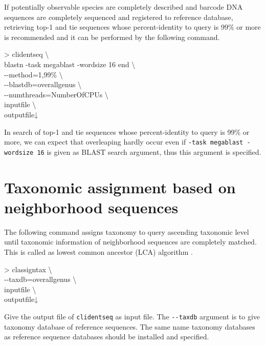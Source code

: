 \documentclass[titlepage,10pt,a4paper,english]{jsbook}
\newenvironment{cmd}{\begin{oframed}\raggedright\ttfamily\footnotesize\setlength{\baselineskip}{1.4em}}{\end{oframed}\vspace{-1em}}
\begin{document}
If potentially observable species are completely described and barcode DNA sequences are completely sequenced and registered to reference database, retrieving top-1 and tie sequences whose percent-identity to query is 99\% or more is recommended and it can be performed by the following command.
\begin{cmd}
{\textgreater} clidentseq {\textbackslash}\\
blastn -task megablast -word{\textunderscore}size 16 end {\textbackslash}\\
{-}{-}method=1,99\% {\textbackslash}\\
{-}{-}blastdb=overall{\textunderscore}genus {\textbackslash}\\
{-}{-}numthreads=NumberOfCPUs {\textbackslash}\\
inputfile {\textbackslash}\\
outputfile↓
\end{cmd}
In search of top-1 and tie sequences whose percent-identity to query is 99\% or more, we can expect that overleaping hardly occur even if \texttt{-task megablast -word{\textunderscore}size 16} is given as BLAST search argument, thus this argument is specified.

\section{Taxonomic assignment based on neighborhood sequences}

The following command assigns taxonomy to query ascending taxonomic level until taxonomic information of neighborhood sequences are completely matched.
This is called as lowest common ancestor (LCA) algorithm \citep{Huson2007}.
\begin{cmd}
{\textgreater} classigntax {\textbackslash}\\
{-}{-}taxdb=overall{\textunderscore}genus {\textbackslash}\\
inputfile {\textbackslash}\\
outputfile↓
\end{cmd}
Give the output file of \texttt{clidentseq} as input file.
The \texttt{{-}{-}taxdb} argument is to give taxonomy database of reference sequences.
The same name taxonomy databases as reference sequence databases should be installed and specified.
\end{document}
